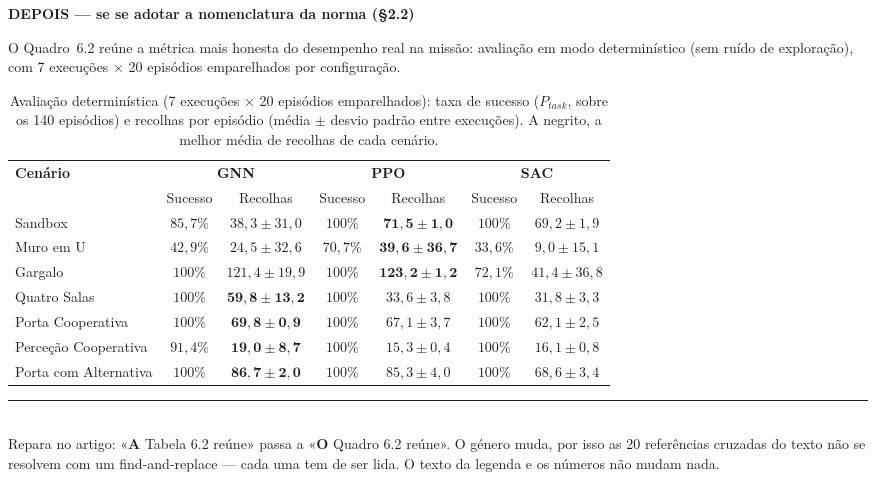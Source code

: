 \documentclass[12pt,reqno,twoside]{amsbook}
\numberwithin{table}{chapter}
\newcommand{\rotulo}[2]{%
  \par\medskip\noindent
  \colorbox{#1}{\parbox{\dimexpr\textwidth-2\fboxsep}{\bfseries\sffamily #2}}%
  \par\medskip}
\begin{document}
\clearpage
\rotulo{black!10}{DEPOIS — se se adotar a nomenclatura da norma (§2.2)}

\setcounter{table}{1}
\renewcommand{\tablename}{Quadro}

O Quadro~6.2 reúne a métrica mais honesta do desempenho real na missão:
avaliação em modo determinístico (sem ruído de exploração), com 7 execuções
$\times$ 20 episódios emparelhados por configuração.

\begin{table}[H]
\centering
\footnotesize
\caption{Avaliação determinística (7 execuções $\times$ 20 episódios emparelhados): taxa de sucesso ($P_{task}$, sobre os 140 episódios) e recolhas por episódio (média $\pm$ desvio padrão entre execuções). A negrito, a melhor média de recolhas de cada cenário.}
\renewcommand{\arraystretch}{1.3}
\begin{tabular}{|l|c|c|c|c|c|c|}
\hline
\textbf{Cenário} & \multicolumn{2}{c|}{\textbf{GNN}} & \multicolumn{2}{c|}{\textbf{PPO}} & \multicolumn{2}{c|}{\textbf{SAC}} \\ \cline{2-7}
 & Sucesso & Recolhas & Sucesso & Recolhas & Sucesso & Recolhas \\ \hline
Sandbox & $85{,}7\%$ & $38{,}3 \pm 31{,}0$ & $100\%$ & $\mathbf{71{,}5 \pm 1{,}0}$ & $100\%$ & $69{,}2 \pm 1{,}9$ \\ \hline
Muro em U & $42{,}9\%$ & $24{,}5 \pm 32{,}6$ & $70{,}7\%$ & $\mathbf{39{,}6 \pm 36{,}7}$ & $33{,}6\%$ & $9{,}0 \pm 15{,}1$ \\ \hline
Gargalo & $100\%$ & $121{,}4 \pm 19{,}9$ & $100\%$ & $\mathbf{123{,}2 \pm 1{,}2}$ & $72{,}1\%$ & $41{,}4 \pm 36{,}8$ \\ \hline
Quatro Salas & $100\%$ & $\mathbf{59{,}8 \pm 13{,}2}$ & $100\%$ & $33{,}6 \pm 3{,}8$ & $100\%$ & $31{,}8 \pm 3{,}3$ \\ \hline
Porta Cooperativa & $100\%$ & $\mathbf{69{,}8 \pm 0{,}9}$ & $100\%$ & $67{,}1 \pm 3{,}7$ & $100\%$ & $62{,}1 \pm 2{,}5$ \\ \hline
Perceção Cooperativa & $91{,}4\%$ & $\mathbf{19{,}0 \pm 8{,}7}$ & $100\%$ & $15{,}3 \pm 0{,}4$ & $100\%$ & $16{,}1 \pm 0{,}8$ \\ \hline
Porta com Alternativa & $100\%$ & $\mathbf{86{,}7 \pm 2{,}0}$ & $100\%$ & $85{,}3 \pm 4{,}0$ & $100\%$ & $68{,}6 \pm 3{,}4$ \\ \hline
\end{tabular}
\end{table}

\vfill
\noindent\rule{\textwidth}{0.4pt}\\[2pt]
{\footnotesize\sffamily Repara no artigo: «\textbf{A} Tabela 6.2 reúne» passa a
«\textbf{O} Quadro 6.2 reúne». O género muda, por isso as 20 referências
cruzadas do texto não se resolvem com um find-and-replace — cada uma tem de ser
lida. O texto da legenda e os números não mudam nada.}
\end{document}

